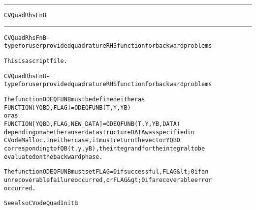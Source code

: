 \begin{samepage}
\hrule
\begin{center}
{\large \verb!CVQuadRhsFnB!}
\label{p:CVQuadRhsFnB}
\end{center}
\hrule\vspace{0.1in}



\begin{alltt}
CVQuadRhsFnB - type for user provided quadrature RHS function for backward problems
\end{alltt}

\end{samepage}



\begin{samepage}


\begin{alltt}
This is a script file. 
\end{alltt}

\end{samepage}



\begin{alltt}
CVQuadRhsFnB - type for user provided quadrature RHS function for backward problems

   The function ODEQFUNB must be defined either as
        FUNCTION [YQBD, FLAG] = ODEQFUNB(T,Y,YB)
   or as
        FUNCTION [YQBD, FLAG, NEW_DATA] = ODEQFUNB(T,Y,YB,DATA)
   depending on whether a user data structure DATA was specified in
   CVodeMalloc. In either case, it must return the vector YQBD
   corresponding to fQB(t,y,yB), the integrand for the integral to be 
   evaluated on the backward phase.

   The function ODEQFUNB must set FLAG=0 if successful, FLAG&lt;0 if an
   unrecoverable failure occurred, or FLAG&gt;0 if a recoverable error
   occurred.

   See also CVodeQuadInitB
\end{alltt}






\vspace{0.1in}